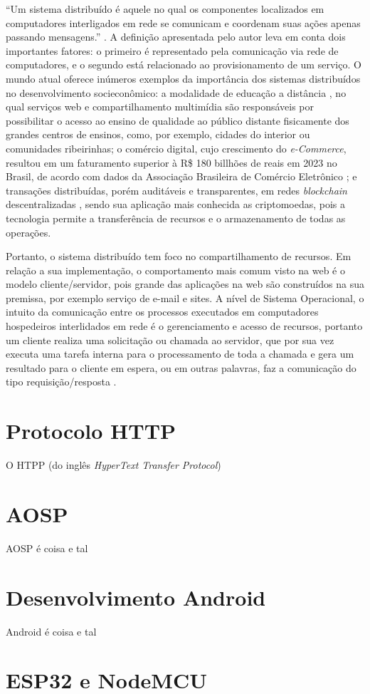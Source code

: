``Um sistema distribuído é aquele no qual os componentes localizados em computadores interligados em rede se comunicam e coordenam suas ações apenas passando mensagens.'' \cite[pp. 1]{sistemas-distribuidos-coulouris2013}.
A definição apresentada pelo autor leva em conta dois importantes fatores: o primeiro é representado pela comunicação via rede de computadores, e o segundo está relacionado ao provisionamento de um serviço.
O mundo atual oferece inúmeros exemplos da importância dos sistemas distribuídos no desenvolvimento socieconômico: a modalidade de educação a distância \cite{mec-ead}, no qual serviços web e compartilhamento
multimídia são responsáveis por possibilitar o acesso ao ensino de qualidade ao público distante fisicamente dos grandes centros de ensinos, como, por exemplo, cidades do interior ou comunidades ribeirinhas; o comércio digital, cujo crescimento do \textit{e-Commerce},
resultou em um faturamento superior à R\$ 180 billhões de reais em 2023 no Brasil, de acordo com dados da Associação Brasileira de Comércio Eletrônico \cite{abcomm-ecomerce}; e transações distribuídas, porém auditáveis e transparentes, em redes \textit{blockchain} descentralizadas \cite{juliana-blockchain}, sendo sua 
aplicação mais conhecida as criptomoedas, pois a tecnologia permite a transferência de recursos e o armazenamento de todas as operações.  

Portanto, o sistema distribuído tem foco no compartilhamento de recursos. Em relação a sua implementação, o comportamento mais comum visto na web é o modelo cliente/servidor, pois 
grande das aplicações na web são construídos na sua premissa, por exemplo serviço de e-mail e sites. 
A nível de Sistema Operacional, o intuito da comunicação entre os processos executados em computadores hospedeiros interlidados em rede é o gerenciamento e acesso de recursos, portanto um cliente realiza
uma solicitação ou chamada ao servidor, que por sua vez executa uma tarefa interna para o processamento de toda a chamada e gera um resultado para o cliente em espera, ou em outras palavras, faz a comunicação do tipo requisição/resposta \cite[pp. 16]{sistemas-distribuidos-coulouris2013}. 

\section{Protocolo HTTP}

O HTPP (do inglês \textit{HyperText Transfer Protocol})

\section{AOSP}

AOSP é coisa e tal

\section{Desenvolvimento Android}

Android é coisa e tal 

\section{ESP32 e NodeMCU}